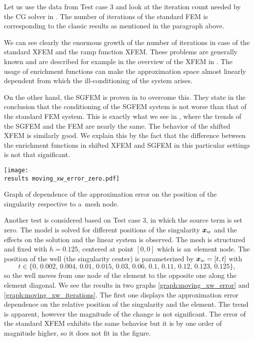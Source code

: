 Let us use the data from Test case 3 and look at the iteration count needed by the CG solver in .
The number of iterations of the standard FEM is corresponding to the classic results as mentioned in the paragraph above. 

We can see clearly the enormous growth of the number of iterations in case of the standard XFEM and the ramp 
function XFEM. These problems are generally known and are described for example in the overview of the XFEM in
\cite{fries_xfem_overview_2010}. The usage of enrichment functions can make the approximation space almost linearly 
dependent from which the ill-conditioning of the system arises. 

On the other hand, the SGFEM is proven in \cite{babuska_stable_2012} to overcome this. They state in the conclusion that
the conditioning of the SGFEM system is not worse than that of the standard FEM system.
This is exactly what we see in , where the trends of the SGFEM and the FEM are nearly the same.
The behavior of the shifted XFEM is similarly good. We explain this by the fact that the difference between the enrichment functions
in shifted XFEM and SGFEM in this particular settings is not that significant.


\begin{graph}[!htb]
  \centering    
    \texttt{[image: \\results moving\_xw\_error\_zero.pdf]}
  \caption[Approximation error dependence on singularity position.]{Graph of dependence of the approximation error
   on the position of the singularity respective to a~mesh node.}
  \label{graph:moving_xw_error}
\end{graph}
%
Another test is considered based on Test case 3, in which the source term is set zero. The model is solved for different 
positions of the singularity $\mathbf{\boldsymbol{x}}_w$ and the effects on the solution and the linear system is observed. The mesh is structured and fixed with $h=0.125$,
centered at point $[0,0]$ which is an~element node. The position of the well (the singularity center) is parameterized by $\mathbf{\boldsymbol{x}}_w = [t,t]$ with 
\[t\in\{0,\, 0.002,\, 0.004,\, 0.01,\, 0.015,\, 0.03,\, 0.06,\, 0.1,\, 0.11,\, 0.12,\, 0.123,\, 0.125\},\]
so the well moves from one node of the element to the opposite one along the element diagonal. 
We see the results in two graphs \ref{graph:moving_xw_error} and \ref{graph:moving_xw_iterations}. The first one displays
the approximation error dependence on the relative position of the singularity and the element. The trend is apparent,
however the magnitude of the change is not significant. The error of the standard XFEM exhibits the same behavior
but it is by one order of magnitude higher, so it does not fit in the figure.

